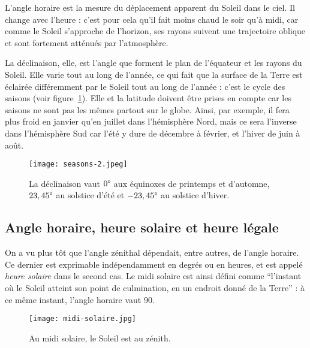 \documentclass[12pt]{article}
\begin{document}
L'angle horaire est la mesure du déplacement apparent du Soleil dans le ciel. 
Il change avec l'heure : c'est pour cela qu'il fait moins chaud le soir qu'à midi, car comme le Soleil s'approche de l'horizon, ses rayons suivent une trajectoire oblique et sont fortement atténués par l'atmosphère.

La déclinaison, elle, est l'angle que forment le plan de l'équateur et les rayons du Soleil.
Elle varie tout au long de l'année,  ce qui fait que la surface de la Terre est éclairée différemment par le Soleil tout au long de l'année : c'est le cycle des saisons (voir figure~\ref{fig:seasons-year}). Elle et la latitude doivent être prises en compte car les saisons ne sont pas les mêmes partout sur le globe.
Ainsi, par exemple, il fera plus froid en janvier qu'en juillet dans l'hémisphère Nord, mais ce sera l'inverse dans l'hémisphère Sud car l'été y dure de décembre à février, et l'hiver de juin à août.

 \begin{figure}[H]
	\centerline{\texttt{[image: seasons-2.jpeg]}}
	\caption{La déclinaison vaut $0\degree$ aux équinoxes de printemps et d'automne, $23,45\degree$ au solstice d'été et $-23,45\degree$ au solstice d'hiver.}
	\label{fig:seasons-year}
\end{figure}
	

\subsection{Angle horaire, heure solaire et heure légale}

On a vu plus tôt que l'angle zénithal dépendait, entre autres, de l'angle horaire.
Ce dernier est exprimable indépendamment en degrés ou en heures, et est appelé \emph{heure solaire} dans le second cas.
Le midi solaire est ainsi défini comme ``l'instant où le Soleil atteint son point de culmination, en un endroit donné de la Terre''\cite{temps_solaire_wiki} : à ce même instant, l'angle horaire vaut 90\degree.

 \begin{figure}[H]
	\centerline{\texttt{[image: midi-solaire.jpg]}}
	\caption{Au midi solaire, le Soleil est au zénith.}
	\label{fig:solar-noon}
\end{figure}
\end{document}
